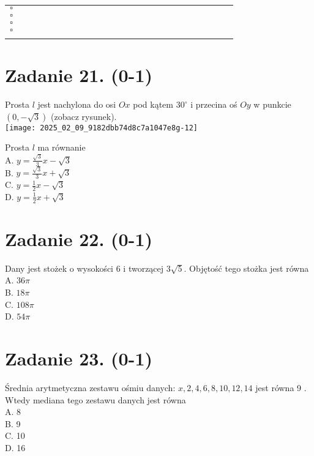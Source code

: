 \documentclass[10pt]{article}
\begin{document}
\begin{center}
\begin{tabular}{|c|c|c|c|c|c|c|c|c|c|c|c|c|c|c|c|c|c|c|c|c|c|c|}
\hline
 &  &  &  &  &  &  &  &  &  &  &  &  &  &  &  &  &  &  &  &  &  &  \\
\hline
\(\square\) &  &  &  &  &  &  &  &  &  &  &  &  &  &  &  &  &  &  &  &  &  &  \\
\hline
\(\square\) &  &  &  &  &  &  &  &  &  &  &  &  &  &  &  &  &  &  &  &  &  &  \\
\hline
\(\square\) &  &  &  &  &  &  &  &  &  &  &  &  &  &  &  &  &  &  &  &  &  &  \\
\hline
\(\square\) &  &  &  &  &  &  &  &  &  &  &  &  &  &  &  &  &  &  &  &  &  &  \\
\hline
 &  &  &  &  &  &  &  &  &  &  &  &  &  &  &  &  &  &  &  &  &  &  \\
\hline
\end{tabular}
\end{center}

\section*{Zadanie 21. (0-1)}
Prosta \(l\) jest nachylona do osi \(O x\) pod kątem \(30^{\circ}\) i przecina oś \(O y\) w punkcie \((0,-\sqrt{3})\) (zobacz rysunek).\\
\texttt{[image: 2025\_02\_09\_9182dbb74d8c7a1047e8g-12]}

Prosta \(l\) ma równanie\\
A. \(y=\frac{\sqrt{3}}{3} x-\sqrt{3}\)\\
B. \(y=\frac{\sqrt{3}}{3} x+\sqrt{3}\)\\
C. \(y=\frac{1}{2} x-\sqrt{3}\)\\
D. \(y=\frac{1}{2} x+\sqrt{3}\)

\section*{Zadanie 22. (0-1)}
Dany jest stożek o wysokości 6 i tworzącej \(3 \sqrt{5}\). Objętość tego stożka jest równa\\
A. \(36 \pi\)\\
B. \(18 \pi\)\\
C. \(108 \pi\)\\
D. \(54 \pi\)

\section*{Zadanie 23. (0-1)}
Średnia arytmetyczna zestawu ośmiu danych: \(x, 2,4,6,8,10,12,14\) jest równa 9 . Wtedy mediana tego zestawu danych jest równa\\
A. 8\\
B. 9\\
C. 10\\
D. 16
\end{document}

